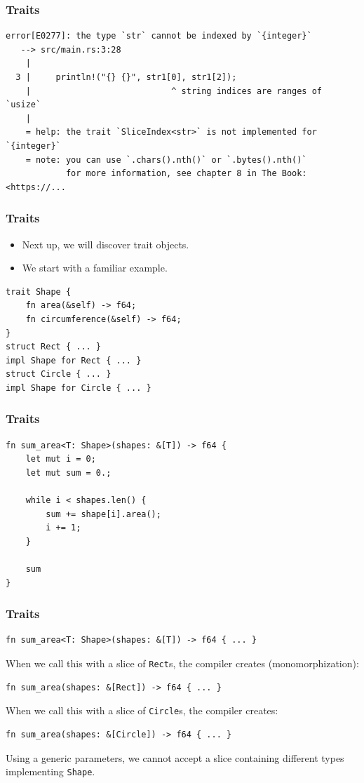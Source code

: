 \begin{frame}[fragile]
    \frametitle{Traits}
    \begin{verbatim}
error[E0277]: the type `str` cannot be indexed by `{integer}`
   --> src/main.rs:3:28
    |
  3 |     println!("{} {}", str1[0], str1[2]);
    |                            ^ string indices are ranges of `usize`
    |
    = help: the trait `SliceIndex<str>` is not implemented for `{integer}`
    = note: you can use `.chars().nth()` or `.bytes().nth()`
            for more information, see chapter 8 in The Book: <https://...  
    \end{verbatim}
\end{frame}

\begin{frame}[fragile]
    \frametitle{Traits}
    \begin{itemize}
        \item Next up, we will discover trait objects.
        \item We start with a familiar example.
    \end{itemize}
    \pause
    \vfill
    \begin{verbatim}
trait Shape {
    fn area(&self) -> f64;
    fn circumference(&self) -> f64;
}
struct Rect { ... }
impl Shape for Rect { ... }
struct Circle { ... }
impl Shape for Circle { ... }
    \end{verbatim}
\end{frame}

\begin{frame}[fragile]
    \frametitle{Traits}
    \begin{verbatim}
fn sum_area<T: Shape>(shapes: &[T]) -> f64 {
    let mut i = 0;
    let mut sum = 0.;

    while i < shapes.len() {
        sum += shape[i].area();
        i += 1;
    }

    sum
}
    \end{verbatim}
\end{frame}

\begin{frame}[fragile]
    \frametitle{Traits}
    \begin{verbatim}
fn sum_area<T: Shape>(shapes: &[T]) -> f64 { ... }
    \end{verbatim}
    \pause
    \vfill
    When we call this with a slice of \texttt{Rect}s, the compiler creates (monomorphization):
    \begin{verbatim}
fn sum_area(shapes: &[Rect]) -> f64 { ... }
    \end{verbatim}
    \pause
    \vfill
    When we call this with a slice of \texttt{Circle}s, the compiler creates:
    \begin{verbatim}
fn sum_area(shapes: &[Circle]) -> f64 { ... }
    \end{verbatim}
    \pause
    \vfill
    Using a generic parameters, we cannot accept a slice containing different types implementing \texttt{Shape}.
\end{frame}

